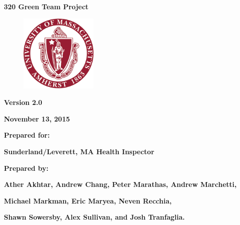 \documentclass[twoside,letterpaper]{article}
\begin{document}
\clearpage\setcounter{page}{1}\pagestyle{Standard}
\thispagestyle{FirstPage}


\bigskip

{\centering{}\bfseries\color{black}
320 Green Team Project
\par}


\bigskip


\begin{figure}
\centering
\includegraphics[width=1.5in,height=1.5in]{Uma_seal.png}
\end{figure}

\bigskip


\bigskip

{\centering{}\bfseries\color{black}
Version 2.0
\par}

{\centering{}\bfseries\color{black}
November 13, 2015
\par}


\bigskip


\bigskip

{\centering{}\bfseries\color{black}
Prepared for:
\par}

{\centering{}\bfseries\color{black}
Sunderland/Leverett, MA Health Inspector
\par}


\bigskip


\bigskip

{\centering{}\bfseries\color{black}
Prepared by:
\par}

{\centering{}\bfseries\color{black}
Ather Akhtar, Andrew Chang, Peter Marathas, Andrew Marchetti, \par}
{\centering{}\bfseries\color{black}
 Michael Markman, Eric Maryea, Neven Recchia,
\par}
{\centering{}\bfseries\color{black}
Shawn Sowersby, Alex Sullivan, and Josh Tranfaglia.\par}
\end{document}
